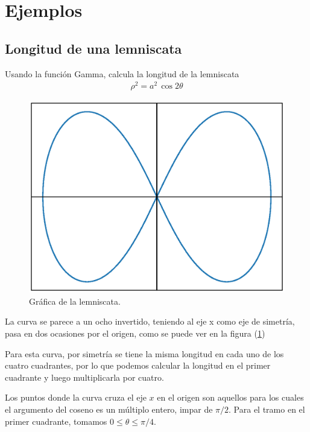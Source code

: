 \section{Ejemplos}
\subsection{Longitud de una lemniscata}
Usando la función Gamma, calcula la longitud de la lemniscata
\begin{align*}
\rho^{2} = a^{2} \, \cos 2 \theta
\end{align*}
\begin{figure}
    \centering
    \includegraphics[scale=0.35]{Imagenes/plot_leminscata_01.eps}
    \caption{Gráfica de la lemniscata.}
    \label{fig:figura_lemniscata}
\end{figure}
La curva se parece a un ocho invertido, teniendo al eje x como eje de simetría, pasa en dos ocasiones por el origen, como se puede ver en la figura (\ref{fig:figura_lemniscata})
\par
Para esta curva, por simetría se tiene la misma longitud en cada uno de los cuatro cuadrantes, por lo que podemos calcular la longitud en el primer cuadrante y luego multiplicarla por cuatro.
\par
Los puntos donde la curva cruza el eje $x$ en el origen son aquellos para los cuales el argumento del coseno es un múltiplo entero, impar de $\pi / 2$.  Para el tramo en el primer cuadrante, tomamos $0 \leq \theta \leq \pi/4$.
\par
